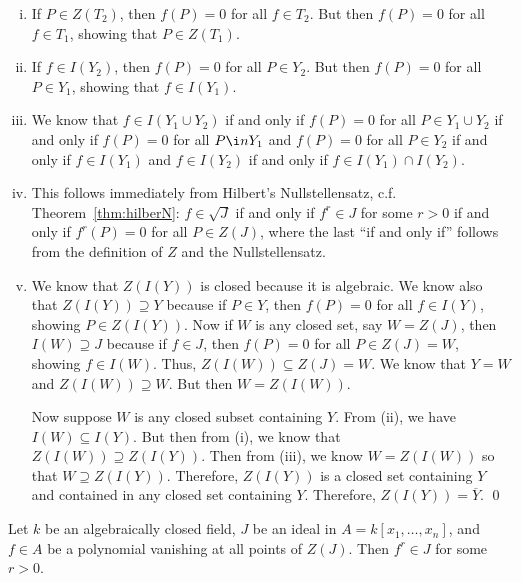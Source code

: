 \pf \hfill
\begin{enumerate}[(i)]
\item If $P \in Z(T_2)$, then $f(P)= 0$ for all $f \in T_2$. But then $f(P)= 0$ for all $f \in T_1$, showing that $P \in Z(T_1)$.

\item If $f \in I(Y_2)$, then $f(P)= 0$ for all $P \in Y_2$. But then $f(P)= 0$ for all $P \in Y_1$, showing that $f \in I(Y_1)$. 

\item We know that $f \in I(Y_1 \cup Y_2)$ if and only if $f(P)= 0$ for all $P \in Y_1 \cup Y_2$ if and only if $f(P)= 0$ for all $P \i nY_1$ and $f(P)= 0$ for all $P \in Y_2$ if and only if $f \in I(Y_1)$ and $f \in I(Y_2)$ if and only if $f \in I(Y_1) \cap I(Y_2)$. 

\item This follows immediately from Hilbert's Nullstellensatz, c.f. Theorem~\ref{thm:hilberN}:  $f \in \sqrt{J}$ if and only if $f^r \in J$ for some $r>0$ if and only if $f^r(P)=0$ for all $P \in Z(J)$, where the last ``if and only if'' follows from the definition of $Z$ and the Nullstellensatz. 

\item We know that $Z(I(Y))$ is closed because it is algebraic. We know also that $Z(I(Y)) \supseteq Y$ because if $P \in Y$, then $f(P)= 0$ for all $f \in I(Y)$, showing $P \in Z(I(Y))$. Now if $W$ is any closed set, say $W= Z(J)$, then $I(W) \supseteq J$ because if $f \in J$, then $f(P)= 0$ for all $P \in Z(J)= W$, showing $f \in I(W)$. Thus, $Z(I(W)) \subseteq Z(J)= W$. We know that $Y=W$ and $Z(I(W)) \supseteq W$. But then $W= Z(I(W))$. 

Now suppose $W$ is any closed subset containing $Y$. From (ii), we have $I(W) \subseteq I(Y)$. But then from (i), we know that $Z(I(W)) \supseteq Z(I(Y))$. Then from (iii), we know $W= Z(I(W))$ so that $W \supseteq Z(I(Y))$. Therefore, $Z(I(Y))$ is a closed set containing $Y$ and contained in any closed set containing $Y$. Therefore, $Z(I(Y))= \overline{Y}$. \qed \\
\end{enumerate}


\begin{thm} \label{thm:hilberN}
Let $k$ be an algebraically closed field, $J$ be an ideal in $A= k[x_1,\ldots,x_n]$, and $f \in A$ be a polynomial vanishing at all points of $Z(J)$. Then $f^r \in J$ for some $r>0$. 
\end{thm}



